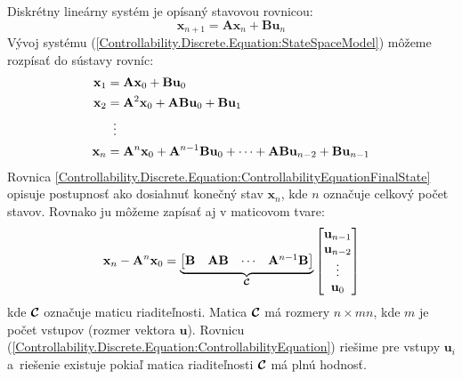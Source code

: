 \documentclass[a4paper, 10pt, ]{article}
\begin{document}
Diskrétny lineárny systém je opísaný stavovou rovnicou:
\begin{equation}
    \label{Controllability.Discrete.Equation:StateSpaceModel}
    \bm{x}_{n + 1} = \bm{A} \bm{x}_{n} + \bm{B} \bm{u}_{n}
\end{equation}
Vývoj systému (\ref{Controllability.Discrete.Equation:StateSpaceModel}) môžeme rozpísať do sústavy rovníc:
\begin{subequations}
    \begin{align}
        \bm{x}_{1} &= \bm{A} \bm{x}_{0} + \bm{B} \bm{u}_{0} \\
        \bm{x}_{2} &= \bm{A}^2 \bm{x}_{0} + \bm{A} \bm{B} \bm{u}_{0} + \bm{B} \bm{u}_{1} \\
        &\vdotswithin{=} \nonumber \\
        \label{Controllability.Discrete.Equation:ControllabilityEquationFinalState}
        \bm{x}_{n} &= \bm{A}^{n} \bm{x}_{0} + \bm{A}^{n - 1} \bm{B} \bm{u}_{0} + \cdots + \bm{A} \bm{B} \bm{u}_{n - 2} + \bm{B} \bm{u}_{n - 1}
    \end{align}
\end{subequations}
Rovnica \ref{Controllability.Discrete.Equation:ControllabilityEquationFinalState} opisuje postupnosť ako dosiahnuť konečný stav $\bm{x}_n$, kde $n$ označuje celkový počet stavov. Rovnako ju môžeme zapísať aj v maticovom tvare:
\begin{equation}
    \label{Controllability.Discrete.Equation:ControllabilityEquation}
    \mathbf{x}_{n} - \mathbf{A}^{n} \mathbf{x}_{0} = 
    \underbrace{
        \begin{bmatrix}
            \mathbf{B} & \mathbf{A} \mathbf{B} & \cdots & \mathbf{A}^{n - 1} \mathbf{B}
        \end{bmatrix}
    }_{\boldsymbol{\mathcal{C}}}
    \begin{bmatrix}
        \mathbf{u}_{n - 1} \\
        \mathbf{u}_{n - 2} \\
        \vdots         \\
        \mathbf{u}_{0}     \\
    \end{bmatrix}
\end{equation}
kde $\boldsymbol{\mathcal{C}}$ označuje maticu riaditeľnosti. Matica $\boldsymbol{\mathcal{C}}$ má rozmery $n \times mn$, kde $m$ je počet vstupov (rozmer vektora $\bm{u}$). Rovnicu (\ref{Controllability.Discrete.Equation:ControllabilityEquation}) riešime pre vstupy $\bm{u}_{i}$ a~riešenie existuje pokiaľ matica riaditeľnosti $\boldsymbol{\mathcal{C}}$ má plnú hodnosť.
\end{document}
